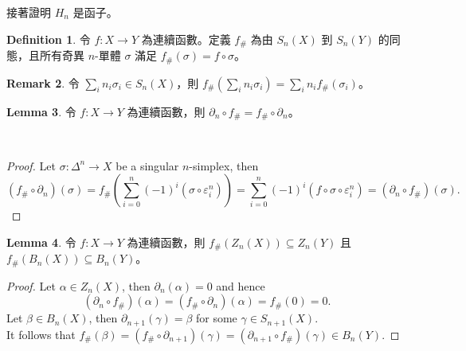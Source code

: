 \documentclass[12pt]{article}
\theoremstyle{definition}
\newtheorem{definition}{Definition}[section]
\newtheorem{remark}[definition]{Remark}
\newtheorem{lemma}[definition]{Lemma}
\newcommand\<{\langle}
\renewcommand\>{\rangle}
\begin{document}
\begin{CJK}{UTF8}{bsmi}
接著證明 $H_n$ 是函子。

\begin{definition}
    令 $f:X\to Y$ 為連續函數。定義 $f_\#$ 為由 $S_n(X)$ 到 $S_n(Y)$ 的同態，且所有奇異 $n$-單體 $\sigma$ 滿足 $f_\#(\sigma)=f\circ\sigma$。
\end{definition}

\begin{remark}
    令 $\sum_i n_i \sigma_i\in S_n(X)$，則 $f_\#\left(\sum_i n_i \sigma_i\right)=\sum_i n_i f_\#(\sigma_i)$。 
\end{remark}

\begin{lemma}
    令 $f:X\to Y$ 為連續函數，則 $\partial_n\circ f_\#=f_\#\circ \partial_n$。
    \begin{center}
     \\
    \end{center}
\end{lemma}
\begin{proof}
    Let $\sigma:\Delta^n\to X$ be a singular $n$-simplex, then
    \[
        (f_\#\circ\partial_n)(\sigma)
         = f_\#\left(\sum_{i=0}^n(-1)^i(\sigma\circ\varepsilon^n_i)\right)
          = \sum_{i=0}^n(-1)^i(f\circ\sigma\circ\varepsilon^n_i)
         = (\partial_n\circ f_\#)(\sigma).
    \]
\end{proof}

\begin{lemma}
    令 $f:X\to Y$ 為連續函數，則 $f_\#(Z_n(X))\subseteq Z_n(Y)$ 且 $f_\#(B_n(X))\subseteq B_n(Y)$。
\end{lemma}
\begin{proof}
    Let $\alpha\in Z_n(X)$, then $\partial_n(\alpha)=0$ and hence 
    \[
        (\partial_n\circ f_\#)(\alpha)=(f_\#\circ\partial_n)(\alpha)=f_\#(0)=0.
    \]
   Let $\beta\in B_n(X)$, then $\partial_{n+1}(\gamma)=\beta$ for some $\gamma\in S_{n+1}(X)$. \\
   It follows that $f_\#(\beta)=(f_\#\circ\partial_{n+1})(\gamma)=(\partial_{n+1}\circ f_\#)(\gamma)\in B_n(Y)$.
\end{proof}


\end{CJK}
\end{document}
